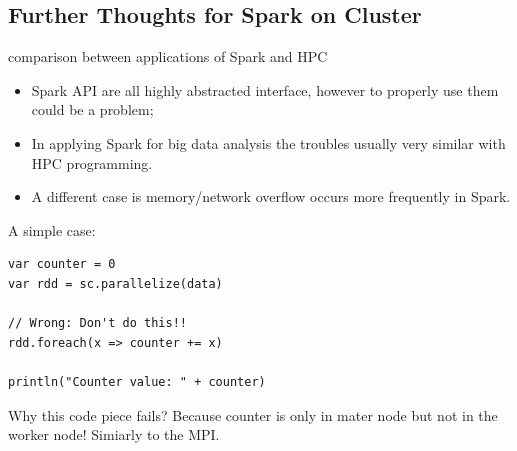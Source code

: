 \documentclass[notheorems, aspectratio=54]{beamer}
\begin{document}
\subsection{Further Thoughts for Spark on Cluster}
\begin{frame}[fragile]

\begin{block}{comparison between applications of Spark and HPC}
 \begin{itemize}
 \item Spark API are all highly abstracted interface, however to properly use them could be a problem;
 \item In applying Spark for big data analysis the troubles usually very similar with HPC programming.
 \item A different case is memory/network overflow occurs more frequently in Spark.
\end{itemize}
\end{block}

A simple case:
\begin{verbatim}
var counter = 0
var rdd = sc.parallelize(data)

// Wrong: Don't do this!!
rdd.foreach(x => counter += x)

println("Counter value: " + counter)
\end{verbatim}

\begin{block}{Why this code piece fails?}
Because counter is only in mater node but not in the worker node! Simiarly to the MPI.
\end{block}

\end{frame}

\end{document}
